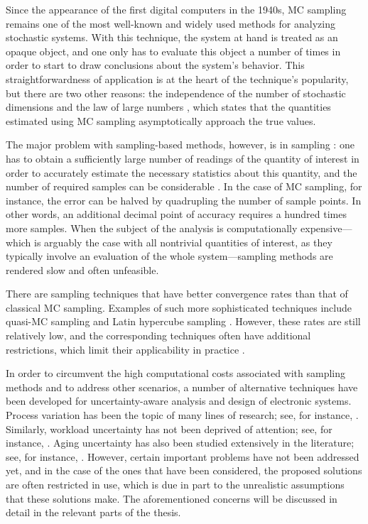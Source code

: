 Since the appearance of the first digital computers in the 1940s, \ac{MC}
sampling remains one of the most well-known and widely used methods for
analyzing stochastic systems. With this technique, the system at hand is treated
as an opaque object, and one only has to evaluate this object a number of times
in order to start to draw conclusions about the system's behavior. This
straightforwardness of application is at the heart of the technique's
popularity, but there are two other reasons: the independence of the number of
stochastic dimensions and the law of large numbers \cite{durrett2010}, which
states that the quantities estimated using \ac{MC} sampling asymptotically
approach the true values.

The major problem with sampling-based methods, however, is in sampling \perse:
one has to obtain a sufficiently large number of readings of the quantity of
interest in order to accurately estimate the necessary statistics about this
quantity, and the number of required samples can be considerable
\cite{diaz-emparanza2002}. In the case of \ac{MC} sampling, for instance, the
error can be halved by quadrupling the number of sample points. In other words,
an additional decimal point of accuracy requires a hundred times more samples.
When the subject of the analysis is computationally expensive---which is
arguably the case with all nontrivial quantities of interest, as they typically
involve an evaluation of the whole system---sampling methods are rendered slow
and often unfeasible.

There are sampling techniques that have better convergence rates than that of
classical \ac{MC} sampling. Examples of such more sophisticated techniques
include quasi-\ac{MC} sampling and Latin hypercube sampling \cite{asmussen2007}.
However, these rates are still relatively low, and the corresponding techniques
often have additional restrictions, which limit their applicability in practice
\cite{xiu2010}.

In order to circumvent the high computational costs associated with sampling
methods and to address other scenarios, a number of alternative techniques have
been developed for uncertainty-aware analysis and design of electronic systems.
Process variation has been the topic of many lines of research; see, for
instance, \cite{bhardwaj2006, vrudhula2006, bhardwaj2008, chandra2010, juan2012,
lee2013}. Similarly, workload uncertainty has not been deprived of attention;
see, for instance, \cite{diaz2002, zhu2008, schranzhofer2009, santinelli2011,
quinton2012, tanasa2015}. Aging uncertainty has also been studied extensively in
the literature; see, for instance, \cite{coskun2006, huang2009b, oboril2012,
firouzi2013, kiamehr2013, das2014c}. However, certain important problems have
not been addressed yet, and in the case of the ones that have been considered,
the proposed solutions are often restricted in use, which is due in part to the
unrealistic assumptions that these solutions make. The aforementioned concerns
will be discussed in detail in the relevant parts of the thesis.
